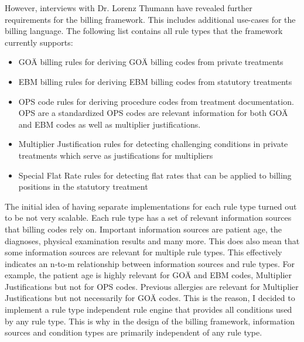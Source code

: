 However, interviews with Dr. Lorenz Thumann have revealed further requirements for the billing framework.
This includes additional use-cases for the billing language.
The following list contains all rule types that the framework currently supports:
\begin{itemize}
    \item GOÄ billing rules for deriving GOÄ billing codes from private treatments
    \item EBM billing rules for deriving EBM billing codes from statutory treatments
    \item OPS code rules for deriving procedure codes from treatment documentation.
    OPS are a standardized
    OPS codes are relevant information for both GOÄ and EBM codes as well as multiplier justifications.
    \item Multiplier Justification rules for detecting challenging conditions in private treatments
    which serve as justifications for multipliers
    \item Special Flat Rate rules
    for detecting flat rates that can be applied to billing positions in the statutory treatment
\end{itemize}


The initial idea of having separate implementations for each rule type turned out to be not very scalable.
Each rule type has a set of relevant information sources that billing codes rely on.
Important information sources are patient age, the diagnoses, physical examination results and many more.
This does also mean that some information sources are relevant for multiple rule types.
This effectively indicates an n-to-m relationship between information sources and rule types.
For example, the patient age is highly relevant for GOÄ and EBM codes, Multiplier Justifications but not for OPS codes.
Previous allergies are relevant for Multiplier Justifications but not necessarily for GOÄ codes.
This is the reason, I decided to implement a rule type independent rule engine that provides all conditions used by any rule type.
This is why in the design of the billing framework, information sources and condition types are primarily independent of any rule type.
